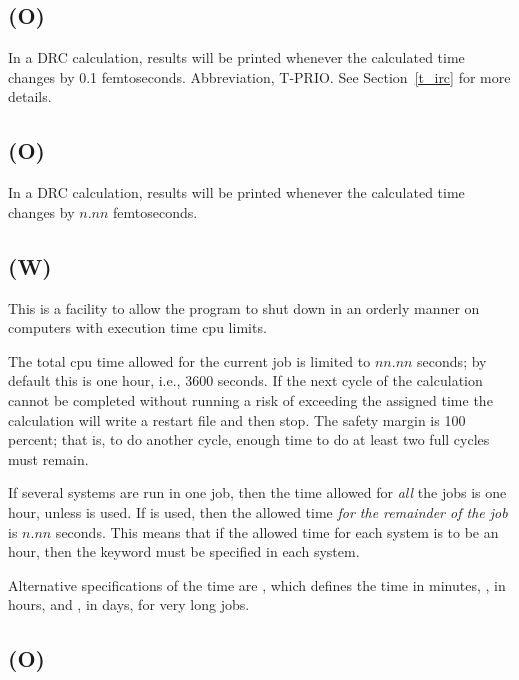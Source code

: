\subsection*{ (O)}
In  a  DRC  calculation,  results  will  be  printed  whenever   the
calculated time changes by 0.1 femtoseconds.  Abbreviation, T-PRIO.
See Section~\ref{t_irc} for more details.


\subsection*{ (O)}
In  a  DRC  calculation,  results  will  be  printed  whenever   the
calculated time changes by $n.nn$ femtoseconds.


\subsection*{ (W)}
This is a facility to allow the program to shut down in  an  orderly
manner on computers with execution time cpu  limits.

The total cpu  time allowed for the current  job  is  limited  to  $nn.nn$  seconds;  by default this is one hour, i.e., 3600
seconds.  If the next cycle of the calculation cannot be completed without
running a  risk of  exceeding the assigned time the calculation will write a
restart file and then stop.  The safety margin is 100 percent; that is, to do
another cycle, enough time to do at least two full cycles must remain.

If several systems are run in one job, then the time allowed for {\em all} the
jobs is one hour, unless  is used.  If  is used,
then the allowed time {\em for the remainder of the job} is $n.nn$ seconds.
This means that if the allowed time for each system is to be an hour, then the
keyword  must be specified in each system.


Alternative specifications of the time are  ,  which  defines
the  time in minutes, , in hours, and , in
days, for very long jobs.

\subsection*{ (O)}

